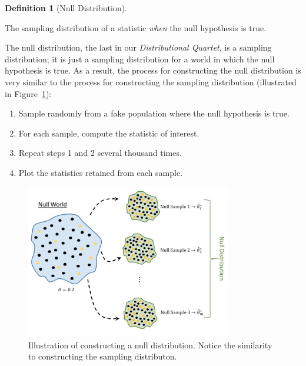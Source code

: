 \documentclass[
  letterpaper,
  DIV=11,
  numbers=noendperiod]{scrreprt}
\providecommand{\tightlist}{%
  \setlength{\itemsep}{0pt}\setlength{\parskip}{0pt}}\usepackage{longtable,booktabs,array}
\theoremstyle{plain}
\theoremstyle{definition}
\theoremstyle{definition}
\newtheorem{definition}{Definition}[chapter]
\theoremstyle{remark}
\begin{document}
\begin{definition}[Null
Distribution]\protect\hypertarget{def-null-distribution}{}\label{def-null-distribution}

The sampling distribution of a statistic \emph{when} the null hypothesis
is true.

\end{definition}

The null distribution, the last in our \emph{Distributional Quartet}, is
a sampling distribution; it is just a sampling distribution for a world
in which the null hypothesis is true. As a result, the process for
constructing the null distribution is very similar to the process for
constructing the sampling distribution (illustrated in
Figure~\ref{fig-nulldistns-null-distribution}):

\begin{enumerate}
\def\labelenumi{\arabic{enumi}.}
\tightlist
\item
  Sample randomly from a fake population where the null hypothesis is
  true.
\item
  For each sample, compute the statistic of interest.
\item
  Repeat steps 1 and 2 several thousand times.
\item
  Plot the statistics retained from each sample.
\end{enumerate}

\begin{figure}

{\centering \includegraphics[width=0.8\textwidth,height=\textheight]{./images/NullDistns-Null-Distribution.jpg}

}

\caption{\label{fig-nulldistns-null-distribution}Illustration of
constructing a null distribution. Notice the similarity to constructing
the sampling distributon.}

\end{figure}
\end{document}
